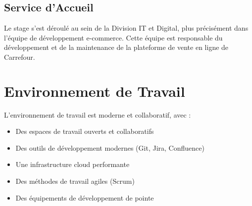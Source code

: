 \subsection{Service d'Accueil}
Le stage s'est déroulé au sein de la Division IT et Digital, plus précisément dans l'équipe de développement e-commerce. Cette équipe est responsable du développement et de la maintenance de la plateforme de vente en ligne de Carrefour.

\section{Environnement de Travail}
L'environnement de travail est moderne et collaboratif, avec :
\begin{itemize}
    \item Des espaces de travail ouverts et collaboratifs
    \item Des outils de développement modernes (Git, Jira, Confluence)
    \item Une infrastructure cloud performante
    \item Des méthodes de travail agiles (Scrum)
    \item Des équipements de développement de pointe
\end{itemize} 